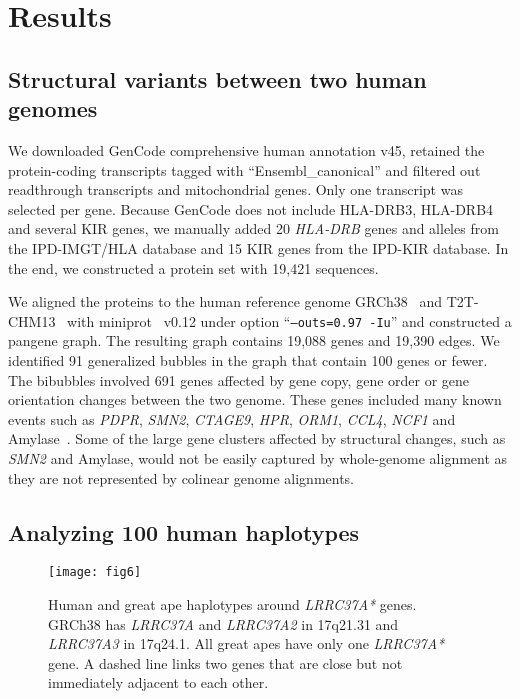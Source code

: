 \documentclass[webpdf,contemporary,large,namedate]{oup-authoring-template}%
\begin{document}
\section{Results}

\subsection{Structural variants between two human genomes}

We downloaded GenCode comprehensive human annotation v45,
retained the protein-coding transcripts tagged with ``Ensembl\_canonical'' and filtered out readthrough transcripts and mitochondrial genes.
Only one transcript was selected per gene.
Because GenCode does not include HLA-DRB3, HLA-DRB4 and several KIR genes,
we manually added 20 {\it HLA-DRB} genes and alleles from the IPD-IMGT/HLA database and
15 KIR genes from the IPD-KIR database.
In the end, we constructed a protein set with 19,421 sequences.

We aligned the proteins to the human reference genome GRCh38~\citep{Schneider:2017aa} and T2T-CHM13~\citep{Nurk:2022up}
with miniprot~\citep{Li:2023ac} v0.12 under option ``{\tt --outs=0.97 -Iu}''
and constructed a pangene graph.
The resulting graph contains 19,088 genes and 19,390 edges.
We identified 91 generalized bubbles in the graph that contain 100 genes or fewer.
The bibubbles involved 691 genes affected by gene copy, gene order or gene orientation changes between the two genome.
These genes included many known events such as {\it PDPR}, {\it SMN2}, {\it CTAGE9}, {\it HPR}, {\it ORM1}, {\it CCL4}, {\it NCF1} and Amylase~\citep{Handsaker:2015ur,Sudmant:2010aa}.
Some of the large gene clusters affected by structural changes, such as {\it SMN2} and Amylase,
would not be easily captured by whole-genome alignment as they are not represented by colinear genome alignments.

\subsection{Analyzing 100 human haplotypes}

\begin{figure}[t!]
\centering
\texttt{[image: fig6]}
\caption{Human and great ape haplotypes around \emph{LRRC37A*} genes.
GRCh38 has \emph{LRRC37A} and \emph{LRRC37A2} in 17q21.31 and \emph{LRRC37A3} in 17q24.1.
All great apes have only one \emph{LRRC37A*} gene.
A dashed line links two genes that are close but not immediately adjacent to each other.
}\label{fig:17inv}
\end{figure}
\end{document}
